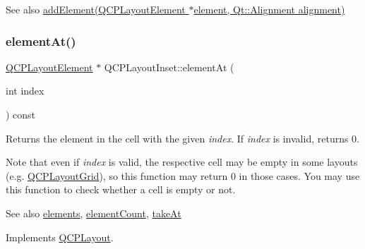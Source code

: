 \begin{DoxySeeAlso}{See also}
\hyperlink{class_q_c_p_layout_inset_ad61529eb576af7f04dff94abb10c745a}{add\+Element(\+Q\+C\+P\+Layout\+Element $\ast$element, Qt\+::\+Alignment alignment)} 
\end{DoxySeeAlso}
\mbox{\label{class_q_c_p_layout_inset_a881ca205605bae9c034733b808f93a02}} 
\subsubsection{\texorpdfstring{element\+At()}{elementAt()}}
{\footnotesize\ttfamily \hyperlink{class_q_c_p_layout_element}{Q\+C\+P\+Layout\+Element} $\ast$ Q\+C\+P\+Layout\+Inset\+::element\+At (\begin{DoxyParamCaption}\item[{int}]{index }\end{DoxyParamCaption}) const\hspace{0.3cm}{\ttfamily [virtual]}}

Returns the element in the cell with the given {\itshape index}. If {\itshape index} is invalid, returns 0.

Note that even if {\itshape index} is valid, the respective cell may be empty in some layouts (e.\+g. \hyperlink{class_q_c_p_layout_grid}{Q\+C\+P\+Layout\+Grid}), so this function may return 0 in those cases. You may use this function to check whether a cell is empty or not.

\begin{DoxySeeAlso}{See also}
\hyperlink{class_q_c_p_layout_aca129722c019f91d3367046f80abfa77}{elements}, \hyperlink{class_q_c_p_layout_inset_a7f5aa4d48a2e844cfe6dd7ed8f0861df}{element\+Count}, \hyperlink{class_q_c_p_layout_inset_abf2e8233f5b7051220907e62ded490a2}{take\+At} 
\end{DoxySeeAlso}


Implements \hyperlink{class_q_c_p_layout_afa73ca7d859f8a3ee5c73c9b353d2a56}{Q\+C\+P\+Layout}.

\mbox{\label{class_q_c_p_layout_inset_a7f5aa4d48a2e844cfe6dd7ed8f0861df}} 
